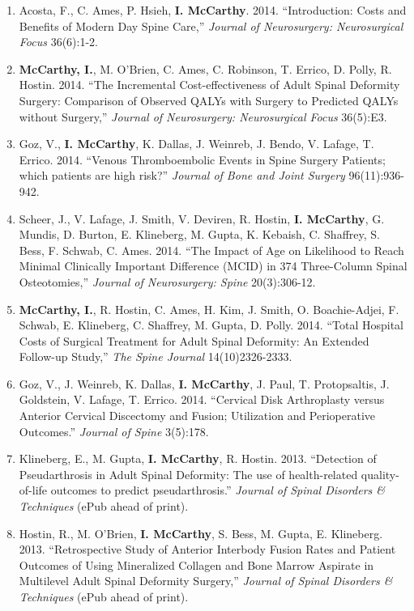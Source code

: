 \documentclass[9pt]{article}
\newenvironment{changemargin}[2]{%
  \begin{list}{}{%
    \setlength{\topsep}{0pt}%
    \setlength{\leftmargin}{#1}%
    \setlength{\rightmargin}{#2}%
    \setlength{\listparindent}{\parindent}%
    \setlength{\itemindent}{\parindent}%
    \setlength{\parsep}{\parskip}%
  }%
  \item[]}{\end{list}
}
\newenvironment{body} {
	\vspace*{-16pt}
	\begin{changemargin}{-0.25in}{-0.5in}
  }	
	{\end{changemargin}
}
\begin{document}
\begin{body}
\begin{enumerate}
    \item Acosta, F., C. Ames, P. Hsieh, \textbf{I. McCarthy}. 2014. ``Introduction: Costs and Benefits of Modern Day Spine Care,'' \textit{Journal of Neurosurgery: Neurosurgical Focus} 36(6):1-2.
    \item \textbf{McCarthy, I.}, M. O'Brien, C. Ames, C. Robinson, T. Errico, D. Polly, R. Hostin. 2014. ``The Incremental Cost-effectiveness of Adult Spinal Deformity Surgery: Comparison of Observed QALYs with Surgery to Predicted QALYs without Surgery,'' \textit{Journal of Neurosurgery: Neurosurgical Focus} 36(5):E3.
    \item Goz, V., \textbf{I. McCarthy}, K. Dallas, J. Weinreb, J. Bendo, V. Lafage, T. Errico. 2014. ``Venous Thromboembolic Events in Spine Surgery Patients; which patients are high risk?'' \textit{Journal of Bone and Joint Surgery} 96(11):936-942.
    \item Scheer, J., V. Lafage, J. Smith, V. Deviren, R. Hostin, \textbf{I. McCarthy}, G. Mundis, D. Burton, E. Klineberg, M. Gupta, K. Kebaish, C. Shaffrey, S. Bess, F. Schwab, C. Ames. 2014. ``The Impact of Age on Likelihood to Reach Minimal Clinically Important Difference (MCID) in 374 Three-Column Spinal Osteotomies,'' \textit{Journal of Neurosurgery: Spine} 20(3):306-12.
    \item \textbf{McCarthy, I.}, R. Hostin, C. Ames, H. Kim, J. Smith, O. Boachie-Adjei, F. Schwab, E. Klineberg, C. Shaffrey, M. Gupta, D. Polly. 2014. ``Total Hospital Costs of Surgical Treatment for Adult Spinal Deformity: An Extended Follow-up Study,'' \textit{The Spine Journal} 14(10)2326-2333.
    \item Goz, V., J. Weinreb, K. Dallas, \textbf{I. McCarthy}, J. Paul, T. Protopsaltis, J. Goldstein, V. Lafage, T. Errico. 2014. ``Cervical Disk Arthroplasty versus Anterior Cervical Discectomy and Fusion; Utilization and Perioperative Outcomes.'' \textit{Journal of Spine} 3(5):178.
    \item Klineberg, E., M. Gupta, \textbf{I. McCarthy}, R. Hostin. 2013. ``Detection of Pseudarthrosis in Adult Spinal Deformity: The use of health-related quality-of-life outcomes to predict pseudarthrosis.'' \textit{Journal of Spinal Disorders \& Techniques} (ePub ahead of print).
    \item Hostin, R., M. O'Brien, \textbf{I. McCarthy}, S. Bess, M. Gupta, E. Klineberg. 2013. ``Retrospective Study of Anterior Interbody Fusion Rates and Patient Outcomes of Using Mineralized Collagen and Bone Marrow Aspirate in Multilevel Adult Spinal Deformity Surgery,'' \textit{Journal of Spinal Disorders \& Techniques} (ePub ahead of print).

\end{enumerate}
\end{body}
\end{document}
